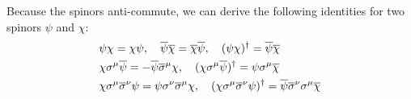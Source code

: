\documentclass[12pt]{report}
\begin{document}
Because the spinors anti-commute, we can derive the following identities for two spinors $\psi$ and $\chi$:
\begin{align}
& \psi \chi = \chi \psi, \quad 
\overline{\psi} \overline{\chi} = \overline{\chi} \overline{\psi}, \quad 
(\psi \chi)^{\dagger} = \overline{\psi} \overline{\chi} \notag \\
& \chi \sigma^{\mu} \overline{\psi} = - \overline{\psi} \overline{\sigma}^{\mu} \chi, \quad 
(\chi \sigma^{\mu} \overline{\psi})^{\dagger} = \psi \sigma^{\mu} \overline{\chi} \notag \\
& \chi \sigma^{\mu} \overline{\sigma}^{\nu} \psi = \psi \sigma^{\nu} \overline{\sigma}^{\mu} \chi, \quad 
(\chi \sigma^{\mu} \overline{\sigma}^{\nu} \psi)^{\dagger} = \overline{\psi} \overline{\sigma}^{\nu} \sigma^{\mu} \overline{\chi}
\end{align}
\end{document}
